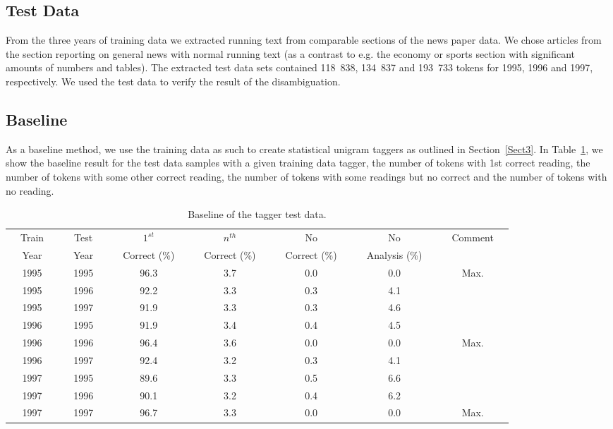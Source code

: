 \documentclass[a4paper]{article}
\begin{document}
\subsection{Test Data}

From the three years of training data we extracted running text from
comparable sections of the news paper data. We chose articles from the
section reporting on general news with normal running text (as a
contrast to e.g. the economy or sports section with significant
amounts of numbers and tables). The extracted test data sets contained
118~838, 134~837 and 193~733 tokens for 1995, 1996 and 1997,
respectively. We used the test data to verify the result of the
disambiguation.

\subsection{Baseline}

As a baseline method, we use the training data as such to create
statistical unigram taggers as outlined in Section~\ref{Sect3}. In
Table~\ref{tab:taggerdata}, we show the baseline result for the test
data samples with a given training data tagger, the number of tokens
with 1st correct reading, the number of tokens with some other correct
reading, the number of tokens with some readings but no correct and
the number of tokens with no reading.

\begin{table}[htb!]
  \centering
  \caption{Baseline of the tagger test data.
  }\label{tab:taggerdata}
  \begin{scriptsize}
    \begin{tabular}{c|c|c|c|c|c|c}
      \hline
      ~~Train~~ & ~~Test~~ & ~~$1^{st}$~~& ~~$n^{th}$~~ & ~~No~~ & ~~No~~ & ~~Comment~~\\
      ~~Year~~ & ~~Year~~ & ~~Correct (\%)~~ & ~~Correct (\%)~~ & ~~Correct (\%)~~ & ~~Analysis (\%)~~ \\
      \hline 
      1995 & 1995 & 96.3 & 3.7 & 0.0 & 0.0 &~~Max.~~\\
      1995 & 1996 & 92.2 & 3.3 & 0.3 & 4.1 & \\
      1995 & 1997 & 91.9 & 3.3 & 0.3 & 4.6 & \\
      \hline 
      1996 & 1995 & 91.9 & 3.4 & 0.4 & 4.5 & \\
      1996 & 1996 & 96.4 & 3.6 & 0.0 & 0.0 & ~~Max.~~\\
      1996 & 1997 & 92.4 & 3.2 & 0.3 & 4.1 & \\
      \hline 
      1997 & 1995 & 89.6 & 3.3 & 0.5 & 6.6 & \\
      1997 & 1996 & 90.1 & 3.2 & 0.4 & 6.2 & \\
      1997 & 1997 & 96.7 & 3.3 & 0.0 & 0.0 & ~~Max.~~\\
      \hline 
    \end{tabular}
  \end{scriptsize}
\end{table}
\end{document}
